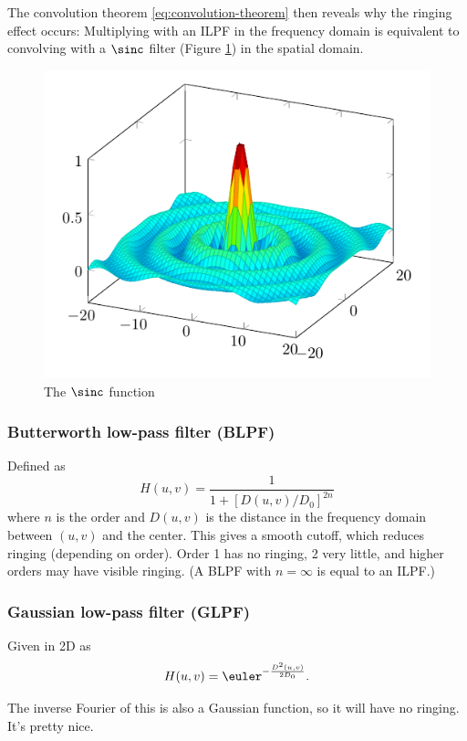 The convolution theorem \eqref{eq:convolution-theorem} then reveals why the ringing effect occurs: Multiplying with an ILPF in the frequency domain is equivalent to convolving with a $\sinc$ filter (Figure \ref{fig:sinc}) in the spatial domain.

\begin{figure}[htbp]
    \centering
    \includegraphics[width=.8\linewidth]{images/sinc_2d_plot}
    \caption{The $\sinc$ function}
    \label{fig:sinc}
\end{figure}

\subsubsection{Butterworth low-pass filter (BLPF)}
Defined as
\begin{equation}
    H(u,v)
    =
    \frac{1}{1 + [D(u,v)/D_0]^{2n}}
\end{equation}
where $n$ is the order and $D(u,v)$ is the distance in the frequency domain between $(u,v)$ and the center. This gives a smooth cutoff, which reduces ringing (depending on order). Order 1 has no ringing, 2 very little, and higher orders may have visible ringing. (A BLPF with $n = \infty$ is equal to an ILPF.)

\subsubsection{Gaussian low-pass filter (GLPF)}
Given in 2D as
\begin{equation}
    H(u,v) = \euler^{-\frac{D^2(u,v)}{2 D_0}}.
\end{equation}

The inverse Fourier of this is also a Gaussian function, so it will have no ringing. It's pretty nice.

